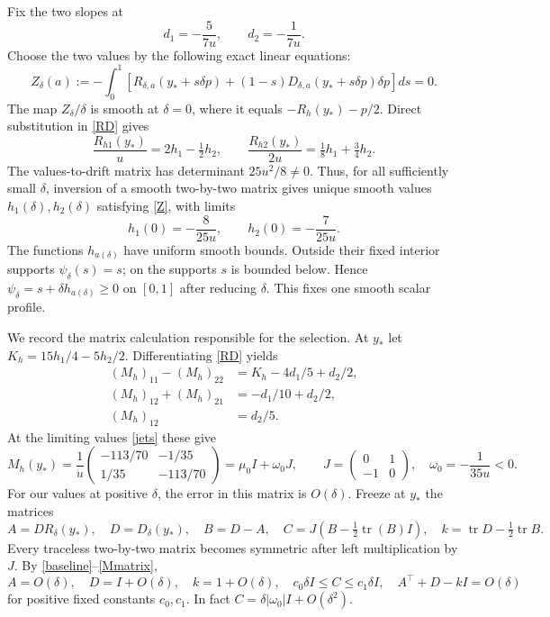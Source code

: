 \documentclass[11pt,a4paper]{article}
\newcommand{\tr}{\operatorname{tr}}
\begin{document}
Fix the two slopes at
\[
 d_1=-\frac5{7u},\qquad d_2=-\frac1{7u}.
\]
Choose the two values by the following exact linear equations:
\begin{equation}\label{Z}
 Z_\delta(a):=-\int_0^1
 \left[R_{\delta,a}(y_*+s\delta p)
 +(1-s)D_{\delta,a}(y_*+s\delta p)\delta p\right]ds=0.
\end{equation}
The map $Z_\delta/\delta$ is smooth at $\delta=0$, where it equals
$-R_h(y_*)-p/2$. Direct substitution in \eqref{RD} gives
\[
 \frac{R_{h1}(y_*)}{u}=2h_1-\tfrac12h_2,
 \qquad \frac{R_{h2}(y_*)}{2u}=\tfrac18h_1+\tfrac34h_2.
\]
The values-to-drift matrix has determinant $25u^2/8\ne0$.
Thus, for all sufficiently small $\delta$, inversion of a smooth
two-by-two matrix gives unique smooth values $h_1(\delta),h_2(\delta)$
satisfying \eqref{Z}, with limits
\begin{equation}\label{jets}
 h_1(0)=-\frac8{25u},\qquad h_2(0)=-\frac7{25u}.
\end{equation}
The functions $h_{a(\delta)}$ have uniform smooth bounds.
Outside their fixed interior supports $\psi_\delta(s)=s$;
on the supports $s$ is bounded below. Hence
$\psi_\delta=s+\delta h_{a(\delta)}\geq0$ on $[0,1]$ after reducing
$\delta$. This fixes one smooth scalar profile.

We record the matrix calculation responsible for the selection.
At $y_*$ let $K_h=15h_1/4-5h_2/2$. Differentiating \eqref{RD} yields
\[
 \begin{split}
 (M_h)_{11}-(M_h)_{22}&=K_h-4d_1/5+d_2/2,\\
 (M_h)_{12}+(M_h)_{21}&=-d_1/10+d_2/2,\\
 (M_h)_{12}&=d_2/5.
 \end{split}
\]
At the limiting values \eqref{jets} these give
\begin{equation}\label{Mmatrix}
 M_h(y_*)=\frac1u
 \begin{pmatrix}-113/70&-1/35\\1/35&-113/70\end{pmatrix}
 =\mu_0I+\omega_0J,
 \qquad J=\begin{pmatrix}0&1\\-1&0\end{pmatrix},\quad
 \omega_0=-\frac1{35u}<0.
\end{equation}
For our values at positive $\delta$, the error in this matrix is
$O(\delta)$. Freeze at $y_*$ the matrices
\begin{equation}\label{ABC}
 A=DR_\delta(y_*),\quad D=D_\delta(y_*),\quad B=D-A,
 \quad C=J\left(B-\tfrac12\tr(B)I\right),\quad
 k=\tr D-\tfrac12\tr B.
\end{equation}
Every traceless two-by-two matrix becomes symmetric after left
multiplication by $J$. By \eqref{baseline}--\eqref{Mmatrix},
\begin{equation}\label{coercivematrices}
 A=O(\delta),\quad D=I+O(\delta),\quad k=1+O(\delta),\quad
 c_0\delta I\leq C\leq c_1\delta I,\quad
 A^\top+D-kI=O(\delta)
\end{equation}
for positive fixed constants $c_0,c_1$. In fact
$C=\delta|\omega_0|I+O(\delta^2)$.
\end{document}
